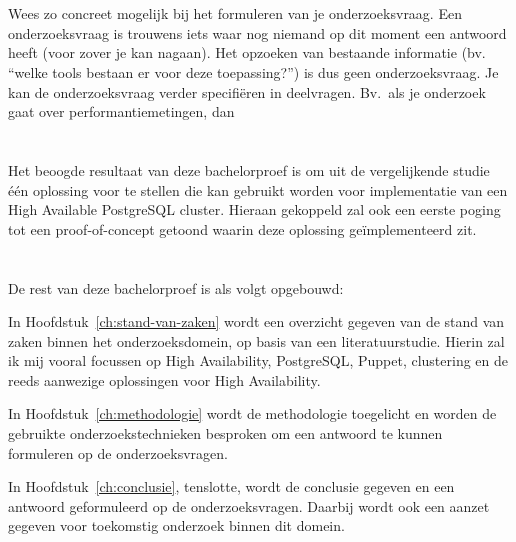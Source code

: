 \section{}
\label{sec:onderzoeksvraag}

Wees zo concreet mogelijk bij het formuleren van je onderzoeksvraag. Een onderzoeksvraag is trouwens iets waar nog niemand op dit moment een antwoord heeft (voor zover je kan nagaan). Het opzoeken van bestaande informatie (bv. ``welke tools bestaan er voor deze toepassing?'') is dus geen onderzoeksvraag. Je kan de onderzoeksvraag verder specifiëren in deelvragen. Bv.~als je onderzoek gaat over performantiemetingen, dan 

\section{}
\label{sec:onderzoeksdoelstelling}

Het beoogde resultaat van deze bachelorproef is om uit de vergelijkende studie één oplossing voor te stellen die kan gebruikt worden voor implementatie van een High Available PostgreSQL cluster. Hieraan gekoppeld zal ook een eerste poging tot een proof-of-concept getoond waarin deze oplossing geïmplementeerd zit.


\section{}
\label{sec:opzet-bachelorproef}


De rest van deze bachelorproef is als volgt opgebouwd:

In Hoofdstuk~\ref{ch:stand-van-zaken} wordt een overzicht gegeven van de stand van zaken binnen het onderzoeksdomein, op basis van een literatuurstudie. Hierin zal ik mij vooral focussen op High Availability, PostgreSQL, Puppet, clustering en de reeds aanwezige oplossingen voor High Availability.

In Hoofdstuk~\ref{ch:methodologie} wordt de methodologie toegelicht en worden de gebruikte onderzoekstechnieken besproken om een antwoord te kunnen formuleren op de onderzoeksvragen.


In Hoofdstuk~\ref{ch:conclusie}, tenslotte, wordt de conclusie gegeven en een antwoord geformuleerd op de onderzoeksvragen. Daarbij wordt ook een aanzet gegeven voor toekomstig onderzoek binnen dit domein.